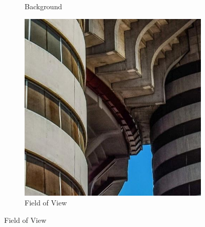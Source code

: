 \begin{figure}[ht]
\begin{subfigure}[b]{0.24\textwidth}
        \caption{Background}
        \label{fig:background}
    \end{subfigure}
    \hfill
    \begin{subfigure}[b]{0.24\textwidth}
        \includegraphics[width=\textwidth]{img/Original.jpg}
        \caption{Field of View}
        \label{fig:FoV}
    \end{subfigure} 


\end{figure}
